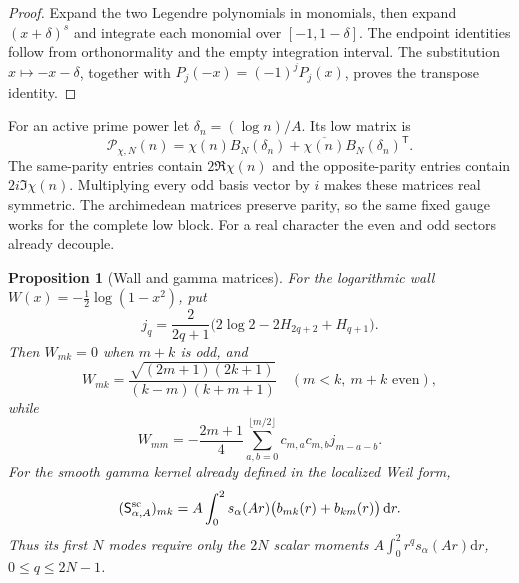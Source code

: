 \documentclass[11pt]{article}
\newtheorem{proposition}[theorem]{Proposition}
\theoremstyle{definition}
\theoremstyle{remark}
\newcommand{\dd}{\mathrm d}
\begin{document}
\begin{proof}
Expand the two Legendre polynomials in monomials, then expand
$(x+\delta)^s$ and integrate each monomial over $[-1,1-\delta]$.
The endpoint identities follow from orthonormality and the empty
integration interval.  The substitution $x\mapsto-x-\delta$, together
with $P_j(-x)=(-1)^jP_j(x)$, proves the transpose identity.
\end{proof}

For an active prime power let $\delta_n=(\log n)/A$.  Its low matrix is
\begin{equation}
 \mathcal P_{\chi,N}(n)
 =\chi(n)B_N(\delta_n)+\overline{\chi(n)}B_N(\delta_n)^{\mathsf T}.
 \label{eq:acq-prime-matrix}
\end{equation}
The same-parity entries contain $2\Re\chi(n)$ and the opposite-parity
entries contain $2i\Im\chi(n)$.  Multiplying every odd basis vector by
$i$ makes these matrices real symmetric.  The archimedean matrices
preserve parity, so the same fixed gauge works for the complete low
block.  For a real character the even and odd sectors already decouple.

\begin{proposition}[Wall and gamma matrices]
\label{prop:acq-arch}
For the logarithmic wall $W(x)=-\frac12\log(1-x^2)$, put
\begin{equation}
 j_q=\frac{2}{2q+1}\bigl(2\log2-2H_{2q+2}+H_{q+1}\bigr).
 \label{eq:acq-log-moment}
\end{equation}
Then $W_{mk}=0$ when $m+k$ is odd, and
\begin{equation}
 W_{mk}=\frac{\sqrt{(2m+1)(2k+1)}}{(k-m)(k+m+1)}
 \quad(m<k,\ m+k\text{ even}),
 \label{eq:acq-wall-offdiag}
\end{equation}
while
\begin{equation}
 W_{mm}=-\frac{2m+1}{4}
 \sum_{a,b=0}^{\lfloor m/2\rfloor}c_{m,a}c_{m,b}j_{m-a-b}.
 \label{eq:acq-wall-diag}
\end{equation}
For the smooth gamma kernel already defined in the localized Weil form,
\begin{equation}
 (\mathsf S_{\alpha,A}^{\rm sc})_{mk}
 =A\int_0^2s_\alpha(Ar)
       \bigl(b_{mk}(r)+b_{km}(r)\bigr)\,\dd r.
 \label{eq:acq-gamma-matrix}
\end{equation}
Thus its first $N$ modes require only the $2N$ scalar moments
$A\int_0^2r^q s_\alpha(Ar)\dd r$, $0\le q\le2N-1$.
\end{proposition}
\end{document}
